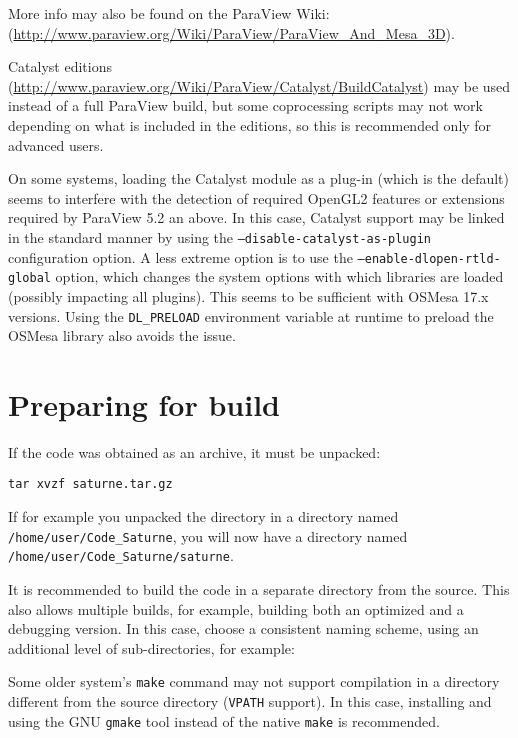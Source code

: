 \documentclass[a4paper,10pt,twoside]{csshortdoc}
\begin{document}
More info may also be found on the ParaView Wiki:
(\url{http://www.paraview.org/Wiki/ParaView/ParaView_And_Mesa_3D}).

Catalyst editions
(\url{http://www.paraview.org/Wiki/ParaView/Catalyst/BuildCatalyst})
may be used instead of a full ParaView build, but some
coprocessing scripts may not work depending on what is included in the
editions, so this is recommended only for advanced users.

On some systems, loading the Catalyst module as a plug-in (which is the
default) seems to interfere with the detection of required OpenGL2 features
or extensions required by ParaView 5.2 an above. In this case, Catalyst
support may be linked in the standard manner by using the
\texttt{--disable-catalyst-as-plugin} configuration option.
A less extreme option is to use the \texttt{--enable-dlopen-rtld-global}
option, which changes the system options with which libraries are loaded
(possibly impacting all plugins). This seems to be sufficient with
OSMesa 17.x versions. Using the \texttt{DL\_PRELOAD} environment variable
at runtime to preload the OSMesa library also avoids the issue.

\section{Preparing for build\label{sec:prepare}}

If the code was obtained as an archive, it must be unpacked:

\texttt{tar xvzf saturne.tar.gz}

If for example you unpacked the directory in a directory
named \texttt{/home/user/Code\_Saturne}, you will now
have a directory named \texttt{/home/user/Code\_Saturne/saturne}.

It is recommended to build the code in a separate directory from the source.
This also allows multiple builds, for example, building both an
optimized and a debugging version. In this case, choose a consistent
naming scheme, using an additional level of sub-directories,
for example:


Some older system's {\tt make} command may not support compilation
in a directory different from the source directory ({\tt VPATH}
support). In this case, installing and using the GNU {\tt gmake}
tool instead of the native {\tt make} is recommended.
\end{document}

